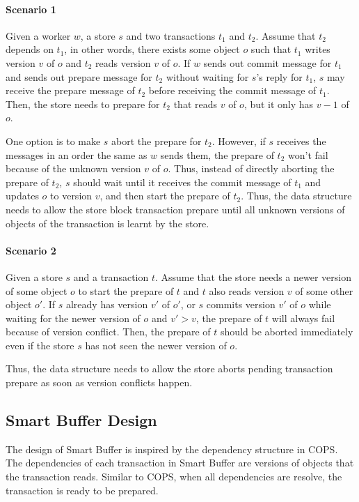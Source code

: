 \documentclass{article}
\begin{document}
\paragraph{Scenario 1} Given a worker $w$, a store $s$ and two transactions $t_1$
and $t_2$. Assume that $t_2$ depends on $t_1$, in other words, there exists some
object $o$ such that $t_1$ writes version $v$ of $o$ and $t_2$ reads version $v$
of $o$. If $w$ sends out commit message for $t_1$ and sends out prepare message
for $t_2$ without waiting for $s$'s reply for $t_1$, $s$ may receive the prepare
message of $t_2$ before receiving the commit message of $t_1$. Then, the store
needs to prepare for $t_2$ that reads $v$ of $o$, but it only has $v - 1$ of
$o$. 

One option is to make $s$ abort the prepare for $t_2$. However, if $s$ receives
the messages in an order the same as $w$ sends them, the prepare of $t_2$ won't
fail because of the unknown version $v$ of $o$. Thus, instead of directly
aborting the prepare of $t_2$, $s$ should wait until it receives the commit
message of $t_1$ and updates $o$ to version $v$, and then start the prepare of
$t_2$. Thus, the data structure needs to allow the store block transaction
prepare until all unknown versions of objects of the transaction is learnt by
the store.

\paragraph{Scenario 2} Given a store $s$ and a transaction $t$. Assume that the
store needs a newer version of some object $o$ to start the prepare of $t$ and
$t$ also reads version $v$ of some other object $o'$. If $s$ already has version
$v'$ of $o'$, or $s$ commits version $v'$ of $o$ while waiting for the newer
version of $o$ and $v' > v$, the prepare of $t$ will always fail because of
version conflict. Then, the prepare of $t$ should be aborted immediately even if
the store $s$ has not seen the newer version of $o$. 

Thus, the data structure needs to allow the store aborts pending transaction
prepare as soon as version conflicts happen.

\subsection{Smart Buffer Design}
The design of Smart Buffer is inspired by the dependency structure in COPS. The
dependencies of each transaction in Smart Buffer are versions of objects that 
the transaction reads. Similar to COPS, when all dependencies are resolve, the
transaction is ready to be prepared.
\end{document}
